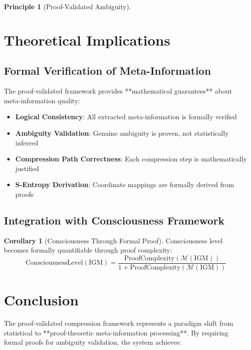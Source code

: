 \documentclass[12pt,a4paper]{article}
\theoremstyle{definition}
\newtheorem{principle}{Principle}
\newtheorem{corollary}{Corollary}
\begin{document}
\begin{principle}[Proof-Validated Ambiguity]
\section{Theoretical Implications}

\subsection{Formal Verification of Meta-Information}

The proof-validated framework provides **mathematical guarantees** about meta-information quality:

\begin{itemize}
\item \textbf{Logical Consistency}: All extracted meta-information is formally verified
\item \textbf{Ambiguity Validation}: Genuine ambiguity is proven, not statistically inferred
\item \textbf{Compression Path Correctness}: Each compression step is mathematically justified
\item \textbf{S-Entropy Derivation}: Coordinate mappings are formally derived from proofs
\end{itemize}

\subsection{Integration with Consciousness Framework}

\begin{corollary}[Consciousness Through Formal Proof]
Consciousness level becomes formally quantifiable through proof complexity:
\begin{equation}
\text{ConsciousnessLevel}(\text{IGM}) = \frac{\text{ProofComplexity}(\mathcal{M}(\text{IGM}))}{1 + \text{ProofComplexity}(\mathcal{M}(\text{IGM}))}
\end{equation}
\end{corollary}

\section{Conclusion}

The proof-validated compression framework represents a paradigm shift from statistical to **proof-theoretic meta-information processing**. By requiring formal proofs for ambiguity validation, the system achieves:


\end{principle}
\end{document}
